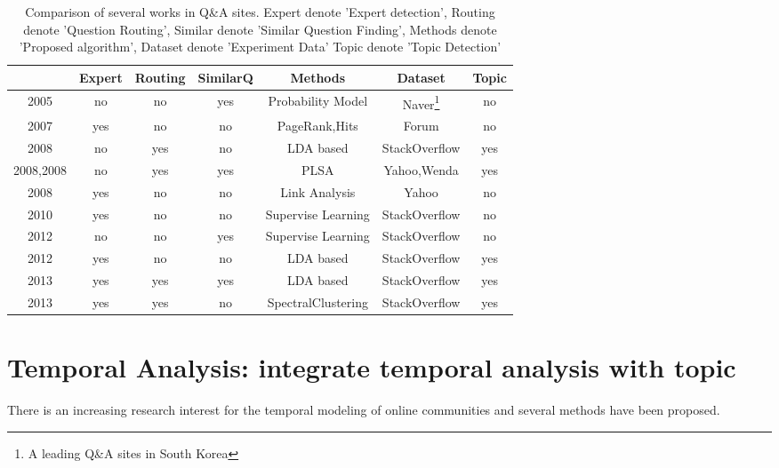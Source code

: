 \begin{sidewaystable}%
\centering
\begin{tabular}{|c|c|c|c|c|c|c|}
\hline
&Expert & Routing &SimilarQ& Methods & Dataset &Topic   \\
\hline
\cite{chp2jeon2005finding} 2005&no&no&yes&Probability Model&Naver\footnote{A leading Q\&A sites in South Korea} & no \\
\hline
 \cite{zhang2007expertise} 2007& yes &no& no& PageRank,Hits&Forum&no  \\
\hline
\cite{Guo:2008:TPQ:1458082.1458204} 2008 & no&yes&no&LDA based&StackOverflow&yes\\
\hline
\cite{chp2Qu:2009:WWW:PLSA:SimlarQ} 2008,\cite{chp2Wu:2008:PLSA:SimlarQ}2008  & no&yes&yes&PLSA&Yahoo,Wenda & yes \\
\hline
\cite{chp2Bouguessa:2008:Identify:authority:indegree} 2008 & yes&no&no&Link Analysis&Yahoo&no\\
\hline
\cite{chp2Pal:2010:Expert:evolution} 2010&yes&no&no&Supervise Learning&StackOverflow&no \\
\hline
\cite{anderson2012discovering} 2012& no&no&yes&Supervise Learning&StackOverflow&no \\
\hline
\cite{chp2Zhou:2012:TPM:2396761.2398493} 2012 & yes & no & no&LDA based &StackOverflow&yes\\
\hline
\cite{yang2013cqarank} 2013& yes&yes&yes& LDA based&StackOverflow&yes   \\
\hline
\cite{Chang:2013}2013 & yes&yes&no& SpectralClustering&StackOverflow&yes  \\
\hline

\end{tabular}
\caption{Comparison of several works in Q\&A sites. Expert denote 'Expert detection', Routing denote 'Question Routing', Similar denote 'Similar Question Finding', Methods denote 'Proposed algorithm', Dataset denote 'Experiment Data' Topic denote 'Topic Detection'}
\label{tab:workcompare}
\end{sidewaystable}


\section{Temporal Analysis: integrate temporal analysis with topic}

There is an increasing research interest for the temporal modeling of online communities and several methods have been proposed. 

